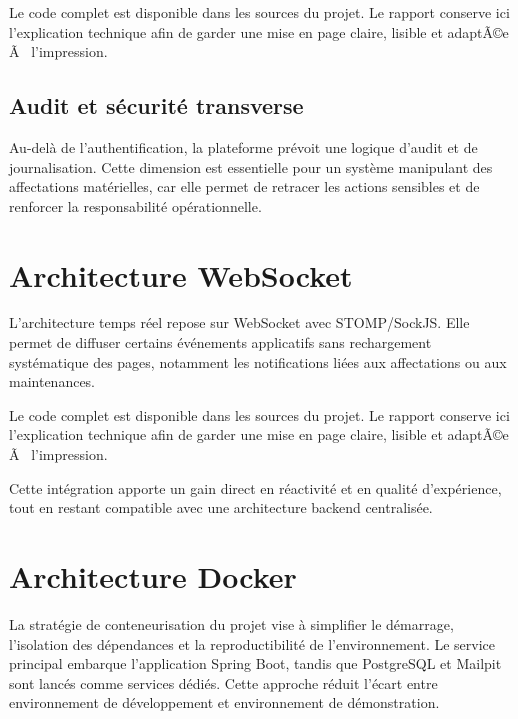﻿\documentclass[12pt,a4paper,oneside]{report}
\newenvironment{codeblock}[1][]{
  \par
  \captionsetup{type=figure}
}{
  \par
}
\begin{document}
\begin{codeblock}[H]
\caption{Génération des jetons JWT}
\begin{keybox}
Le code complet est disponible dans les sources du projet. Le rapport conserve ici l'explication technique afin de garder une mise en page claire, lisible et adaptÃ©e Ã  l'impression.
\end{keybox}
\end{codeblock}

\subsection{Audit et sécurité transverse}
Au-delà de l'authentification, la plateforme prévoit une logique d'audit et de journalisation. Cette dimension est essentielle pour un système manipulant des affectations matérielles, car elle permet de retracer les actions sensibles et de renforcer la responsabilité opérationnelle.

\section{Architecture WebSocket}
L'architecture temps réel repose sur WebSocket avec STOMP/SockJS. Elle permet de diffuser certains événements applicatifs sans rechargement systématique des pages, notamment les notifications liées aux affectations ou aux maintenances.

\begin{codeblock}[H]
\caption{Configuration WebSocket}
\begin{keybox}
Le code complet est disponible dans les sources du projet. Le rapport conserve ici l'explication technique afin de garder une mise en page claire, lisible et adaptÃ©e Ã  l'impression.
\end{keybox}
\end{codeblock}

Cette intégration apporte un gain direct en réactivité et en qualité d'expérience, tout en restant compatible avec une architecture backend centralisée.

\section{Architecture Docker}
La stratégie de conteneurisation du projet vise à simplifier le démarrage, l'isolation des dépendances et la reproductibilité de l'environnement. Le service principal embarque l'application Spring Boot, tandis que PostgreSQL et Mailpit sont lancés comme services dédiés. Cette approche réduit l'écart entre environnement de développement et environnement de démonstration.
\end{document}
